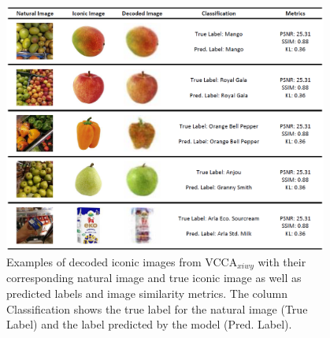 
\begin{figure}[t]
    \centering
    \includegraphics[width=0.95\textwidth]{PaperB/figures_and_tables/figure10.png}
    \vspace{-2mm}
    \caption{Examples of decoded iconic images from VCCA$_{xiwy}$ with their corresponding natural image and true iconic image as well as predicted labels and image similarity metrics. The column Classification shows the true label for the natural image (True Label) and the label predicted by the model (Pred. Label). %
    }
    \label{fig:decoded_iconic_images_with_metrics}
  	\vspace{-3mm}
\end{figure}